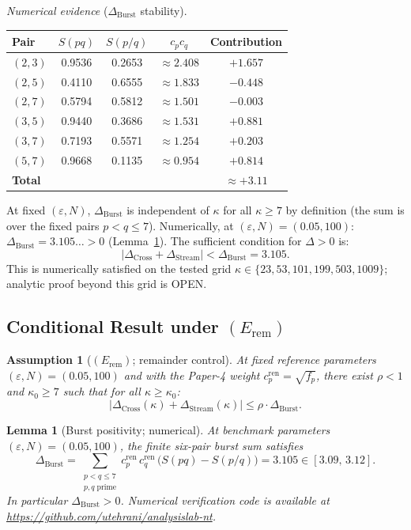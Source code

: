 \documentclass[11pt]{article}
\newtheorem{lemma}[theorem]{Lemma}
\newtheorem{assumption}[theorem]{Assumption}
\newcommand{\Dburstvar}{\Delta_{\mathrm{Burst}}}
\newcommand{\Dcross}{\Delta_{\mathrm{Cross}}}
\newcommand{\Dstream}{\Delta_{\mathrm{Stream}}}
\begin{document}
\emph{Numerical evidence} ($\Dburstvar$ stability).

\begin{center}
\begin{tabular}{lcccc}
\toprule
Pair & $S(pq)$ & $S(p/q)$ & $c_p c_q$ & Contribution \\
\midrule
$(2,3)$ & 0.9536 & 0.2653 & $\approx 2.408$ & $+1.657$ \\
$(2,5)$ & 0.4110 & 0.6555 & $\approx 1.833$ & $-0.448$ \\
$(2,7)$ & 0.5794 & 0.5812 & $\approx 1.501$ & $-0.003$ \\
$(3,5)$ & 0.9440 & 0.3686 & $\approx 1.531$ & $+0.881$ \\
$(3,7)$ & 0.7193 & 0.5571 & $\approx 1.254$ & $+0.203$ \\
$(5,7)$ & 0.9668 & 0.1135 & $\approx 0.954$ & $+0.814$ \\
\midrule
\textbf{Total} & & & & $\mathbf{\approx +3.11}$ \\
\bottomrule
\end{tabular}
\end{center}

At fixed $(\varepsilon,N)$, $\Dburstvar$ is independent of $\kappa$
for all $\kappa\ge 7$ by definition (the sum is over the fixed pairs
$p<q\le 7$). Numerically, at $(\varepsilon,N)=(0.05,100)$:
$\Dburstvar = 3.105\ldots > 0$ (Lemma~\ref{lem:burst-pos}).
The sufficient condition for $\Delta > 0$ is:
\[
|\Dcross + \Dstream| < \Dburstvar = 3.105.
\]
This is numerically satisfied on the tested grid
$\kappa\in\{23,53,101,199,503,1009\}$;
analytic proof beyond this grid is OPEN.

\subsection{Conditional Result under $(E_{\mathrm{rem}})$}

\begin{assumption}[$(E_{\mathrm{rem}})$; remainder control]\label{ass:Erem}
At fixed reference parameters $(\varepsilon,N)=(0.05,100)$
and with the Paper-4 weight $c_p^{\mathrm{ren}}=\sqrt{f_p}$,
there exist $\rho < 1$ and $\kappa_0\ge 7$ such that
for all $\kappa\ge\kappa_0$:
\[
\left|\Dcross(\kappa) + \Dstream(\kappa)\right|
\le \rho\cdot\Dburstvar.
\]
\end{assumption}

\begin{lemma}[Burst positivity; numerical]\label{lem:burst-pos}
At benchmark parameters $(\varepsilon,N)=(0.05,100)$,
the finite six-pair burst sum satisfies
\[
\Dburstvar
= \sum_{\substack{p<q\le7\\p,q\;\mathrm{prime}}}
  c_p^{\mathrm{ren}}\,c_q^{\mathrm{ren}}\,
  \bigl(S(pq)-S(p/q)\bigr)
= 3.105 \in [3.09,\,3.12].
\]
In particular $\Dburstvar > 0$.
Numerical verification code is available at
\url{https://github.com/utehrani/analysislab-nt}.
\end{lemma}
\end{document}
